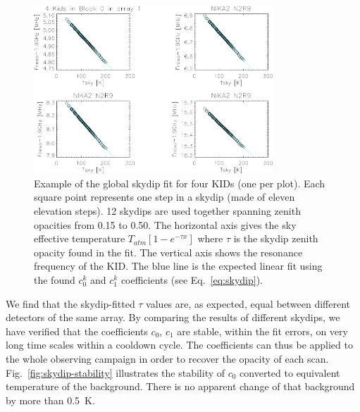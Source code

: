 \begin{figure}[ht!]
\begin{center}
\includegraphics[clip=true,width=0.8\textwidth]{Figures/Opacity/test_allskd4_N2R9v5_5-crop.pdf}
\caption[]{Example of the global skydip fit for four KIDs (one per plot).
Each square point represents one step in a skydip (made of eleven
elevation steps). 12 skydips are used together spanning zenith
opacities from 0.15 to 0.50. The horizontal axis gives the sky
effective temperature $T_{atm}[1-e^{-\tau x}]$ where $\tau$ is the
skydip zenith opacity found in the fit. The vertical axis shows the
resonance frequency of the KID. The blue line is the expected linear
fit using the found $c_0^k$ and $c_1^k$ coefficients (see
Eq.~\ref{eq:skydip}). }
\label{fig:skydipfitexample}
\end{center}
\end{figure}

We find that the skydip-fitted $\tau$ values are, as expected,
equal between different detectors of the same array. By comparing the
results of different skydips, we have verified that the
coefficients $c_0$, $c_1$ are stable, within the fit errors, on very
long time scales within a cooldown cycle. The coefficients can thus be
applied to the whole observing campaign in order to recover the
opacity of each scan. Fig.~\ref{fig:skydip-stability} illustrates the
stability of $c_0$ converted to equivalent temperature of the
background. There is no apparent change of that background by more
than 0.5~K.




